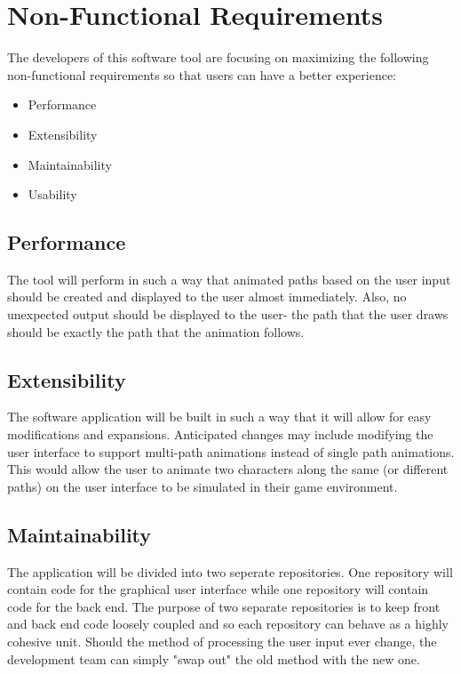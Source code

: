 \section{Non-Functional Requirements}
The developers of this software tool are focusing on maximizing the following non-functional requirements so that users can have a better experience:

\begin{itemize}
 \item Performance
 \item Extensibility
 \item Maintainability
 \item Usability
\end{itemize}

\subsection{Performance}
The tool will perform in such a way that animated paths based on the user input should be created and displayed to the user almost immediately. Also, no unexpected output should be displayed to the user- the path that the user draws should be exactly the path that the animation follows.

\subsection{Extensibility}
The software application will be built in such a way that it will allow for easy modifications and expansions. Anticipated changes may include modifying the user interface to support multi-path animations instead of single path animations. This would allow the user to animate two characters along the same (or different paths) on the user interface to be simulated in their game environment.

\subsection{Maintainability}
The application will be divided into two seperate repositories. One repository will contain code for the graphical user interface while one repository will contain code for the back end. The purpose of two separate repositories is to keep front and back end code loosely coupled and so each repository can behave as a highly cohesive unit. Should the method of processing the user input ever change, the development team can simply "swap out" the old method with the new one.

